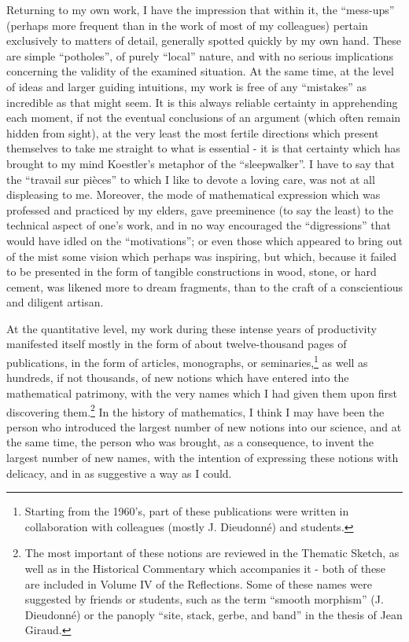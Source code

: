 {Returning to my own work, I have the impression that within it, the ``mess-ups''
(perhaps more frequent than in the work of most of my colleagues) pertain exclusively to
matters of detail, generally spotted quickly by my own hand. These are simple 
``potholes'', of purely ``local'' nature, and with no serious implications concerning
the validity of the examined situation. 
At the same time, at the level of ideas and larger guiding intuitions, my work
is free of any ``mistakes'' as incredible as that might seem.
It is this always reliable certainty in apprehending each moment, if not the eventual
conclusions of an argument (which often remain hidden from sight), at the very least the 
most fertile directions which present themselves to take me straight to what is essential
- it is that certainty which has brought to my mind Koestler's metaphor of the
``sleepwalker''.} I have to say that the 
``travail sur pi\`eces'' to which I like to devote a loving care, 
was not at all displeasing to me. Moreover, the mode of mathematical expression which was
professed and practiced by my elders, gave preeminence (to say the least) to the technical
aspect of one's work, and in no way encouraged the ``digressions'' that would have idled on
the ``motivations''; or even those which appeared to bring out of the mist some vision
which perhaps was inspiring, but which, because it failed to be presented in the form of
tangible constructions in wood, stone, or hard cement, 
was likened more
to dream fragments, than to the craft of a 
conscientious and diligent artisan. 

At the quantitative level, my work during these intense years of productivity 
manifested itself mostly in the form of about twelve-thousand pages of publications, in the form of
articles, monographs, or seminaries,\footnote{Starting from the 1960's, part of these
publications were written in collaboration with colleagues (mostly J. Dieudonn\'e) and
students.} as well as hundreds, if not thousands, of new notions 
which have entered into the mathematical patrimony, with the very names which I had
given them upon first discovering them.\footnote{The most important of these notions are
reviewed in the Thematic Sketch,
as well as in the Historical Commentary
which accompanies it - both of these are included in Volume IV of the Reflections. 
Some of these names were suggested by friends or students, such as the term ``smooth
morphism'' (J. Dieudonn\'e) or the panoply ``site, stack, gerbe, and band'' in the thesis
of Jean Giraud.} In the history of mathematics, I think I may have been the person who
introduced the largest number of new notions into our science, and at the same time, the
person who was brought, as a consequence, to invent the largest number of new names, with
the intention of expressing these notions with delicacy, and in as suggestive a way as I
could.


